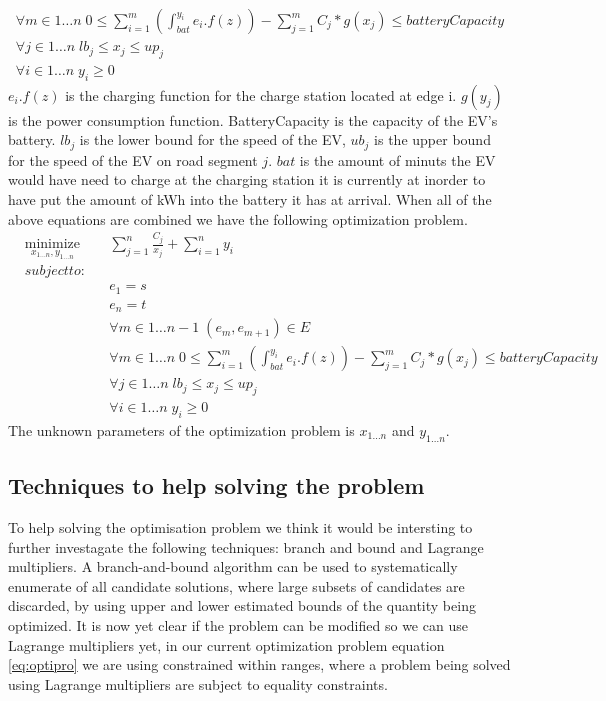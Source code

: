 \begin{gather}
\forall{m \in 1 \dots n} \; 0 \leq \sum_{i=1}^{m} \left( \int_{bat}^{y_i} e_i.f(z) \right) - \sum_{j=1}^{m} C_j*g(x_j) \leq batteryCapacity \\
\forall{j \in 1 \dots n} \; lb_j \leq x_j \leq up_j \\
\forall{i \in 1 \dots n} \; y_i \geq 0
\end{gather}\label{eq:physicalconstraints}
$e_i.f(z)$ is the charging function for the charge station located at edge i. $g(y_j)$ is the power consumption function. BatteryCapacity is the capacity of the EV's battery. 
$lb_j$ is the lower bound for the speed of the EV, $ub_j$ is the upper bound for the speed of the EV on road segment $j$. $bat$ is the amount of minuts the EV would have need to charge at the charging station it is currently at inorder to have put the amount of kWh into the battery it has at arrival. When all of the above equations are combined we have the following optimization problem. 
\begin{equation}
\begin{aligned}
&\underset{x_{1 \dots n},y_{1 \dots n}}{\text{minimize}}
& &\sum_{j=1}^{n} \frac{C_j}{x_j} + \sum_{i=1}^{n} y_i \\
&subject to: \\
&&&e_1 = s \\
&&&e_n = t \\
&&&\forall{m \in 1 \dots n-1} \; (e_m, e_{m+1}) \in E \\
&&&\forall{m \in 1 \dots n} \; 0 \leq \sum_{i=1}^{m} \left( \int_{bat}^{y_i} e_i.f(z) \right) - \sum_{j=1}^{m} C_j*g(x_j) \leq batteryCapacity \\
&&&\forall{j \in 1 \dots n} \; lb_j \leq x_j \leq up_j \\
&&&\forall{i \in 1 \dots n} \; y_i \geq 0 
\end{aligned}
\end{equation} \label{eq:optiproblem}
The unknown parameters of the optimization problem is $x_{1\dots n}$ and $y_{1\dots n}$. 


\subsection{Techniques to help solving the problem}
To help solving the optimisation problem we think it would be intersting to further investagate the following techniques: branch and bound and Lagrange multipliers.
A branch-and-bound algorithm can be used to systematically enumerate  of all candidate solutions, where large subsets of candidates are discarded, by using upper and lower estimated bounds of the quantity being optimized. 
It is now yet clear if the problem can be modified so we can use Lagrange multipliers yet, in our current optimization problem equation \ref{eq:optipro} we are using constrained within ranges, where a problem being solved using Lagrange multipliers are subject to equality constraints.


